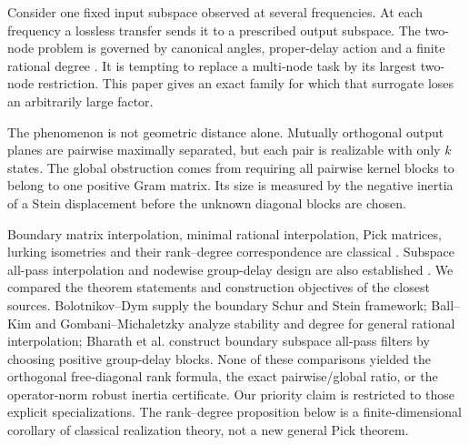 \documentclass[11pt]{article}
\theoremstyle{definition}
\theoremstyle{remark}
\begin{document}
Consider one fixed input subspace observed at several frequencies.  At each
frequency a lossless transfer sends it to a prescribed output subspace.  The
two-node problem is governed by canonical angles, proper-delay action and a
finite rational degree \cite{ErikssonDelayRegions2026,
ErikssonActionMemory2026}.  It is tempting to replace a multi-node task by
its largest two-node restriction.  This paper gives an exact family for
which that surrogate loses an arbitrarily large factor.

The phenomenon is not geometric distance alone.  Mutually orthogonal output
planes are pairwise maximally separated, but each pair is realizable with
only $k$ states.  The global obstruction comes from requiring all pairwise
kernel blocks to belong to one positive Gram matrix.  Its size is measured
by the negative inertia of a Stein displacement before the unknown diagonal
blocks are chosen.

Boundary matrix interpolation, minimal rational interpolation, Pick matrices,
lurking isometries and their rank--degree correspondence are classical
\cite{AntoulasEtAl1990,BallKang1990,BolotnikovDym2006,BallKim1994,BallBolotnikov2018,
GombaniMichaletzky2007}.  Subspace all-pass interpolation and nodewise
group-delay design are also established \cite{BharathEtAl2023}.  We compared
the theorem statements and construction objectives of the closest sources.
Bolotnikov--Dym supply the boundary Schur and Stein framework; Ball--Kim and
Gombani--Michaletzky analyze stability and degree for general rational
interpolation; Bharath et al. construct boundary subspace all-pass filters by
choosing positive group-delay blocks.  None of these comparisons yielded the
orthogonal free-diagonal rank formula, the exact pairwise/global ratio, or the
operator-norm robust inertia certificate.  Our priority claim is restricted
to those explicit specializations.  The rank--degree proposition below is a
finite-dimensional corollary of classical realization theory, not a new
general Pick theorem.
\end{document}
